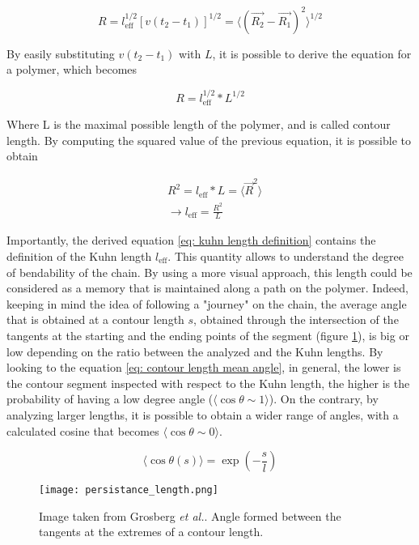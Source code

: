 $$
    R = l_{\text{eff}}^{1/2} [v (t_2 - t_1)]^{1/2} = \langle(\vec{R_2} - \vec{R_1})^2\rangle^{1/2}
$$

By easily substituting $v (t_2 - t_1)$ with $L$, it is possible to derive the equation for a polymer, which becomes

$$
    R = l_{\text{eff}}^{1/2} * L^{1/2}
$$

Where L is the maximal possible length of the polymer, and is called contour length. By computing the squared value of the previous equation, it is possible to obtain

\begin{align} \label{eq: kuhn length definition}
    & R^2 = l_{\text{eff}} * L = \langle\vec{R}^2\rangle \nonumber\\ 
    & \rightarrow l_{\text{eff}} = \frac{R^2}{L} 
\end{align}

Importantly, the derived equation \ref{eq: kuhn length definition} contains the definition of the Kuhn length $l_{\text{eff}}$. This quantity allows to understand the degree of bendability of the chain. By using a more visual approach, this length could be considered as a memory that is maintained along a path on the polymer. Indeed, keeping in mind the idea of following a "journey" on the chain, the average angle that is obtained at a contour length $s$, obtained through the intersection of the tangents at the starting and the ending points of the segment (figure \ref{fig: journey}), is big or low depending on the ratio between the analyzed and the Kuhn lengths. By looking to the equation \ref{eq: contour length mean angle}, in general, the lower is the contour segment inspected with respect to the Kuhn length, the higher is the probability of having a low degree angle ($\langle\cos{\theta} \sim 1\rangle$). On the contrary, by analyzing larger lengths, it is possible to obtain a wider range of angles, with a calculated cosine that becomes $\langle\cos{\theta} \sim 0\rangle$.

\begin{equation} \label{eq: contour length mean angle}
    \langle \cos{\theta(s)}\rangle = \exp{\left(-\frac{s}{l}\right)}
\end{equation}

\begin{figure}[H] 
    \centering 
    \texttt{[image: persistance\_length.png]} 
    \caption{Image taken from Grosberg \textit{et al.}\cite{grosbergGiantMoleculesHere2011}. Angle formed between the tangents at the extremes of a contour length.} 
    \label{fig: journey} 
\end{figure}

